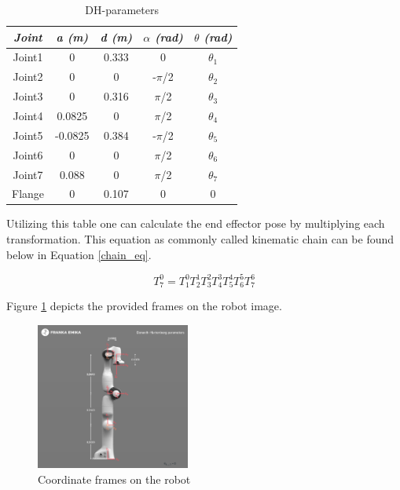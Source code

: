 \begin{table}[ht]
    \caption{DH-parameters}
    \label{dhtable}
    \begin{center}
        \begin{tabular}{|c|c|c|c|c|}
            \hline
            \textbf{\textit{Joint}} & \textbf{\textit{a (m)}} & \textbf{\textit{d (m)}} & \textbf{\textit{ $\alpha$
                (rad)}}& \textbf{\textit{ $\theta$ (rad)}}\\
            \hline
            Joint1 & 0 & 0.333 & 0
            & $\theta_{1}$ \\
            \hline
            Joint2 & 0 & 0 & -$\pi$/2
            & $\theta_{2}$ \\
            \hline
            Joint3 & 0 & 0.316 & $\pi$/2
            & $\theta_{3}$ \\
            \hline
            Joint4 & 0.0825 & 0 & $\pi$/2
            & $\theta_{4}$ \\
            \hline
            Joint5 & -0.0825 & 0.384 & -$\pi$/2
            & $\theta_{5}$ \\
            \hline
            Joint6 & 0 & 0 & $\pi$/2
            & $\theta_{6}$ \\
            \hline
            Joint7 & 0.088 & 0 & $\pi$/2
            & $\theta_{7}$ \\
            \hline
            Flange & 0 & 0.107 & 0 & 0 \\
            \hline
        \end{tabular}
        \label{tab2}
    \end{center}
\end{table}

Utilizing this table one can calculate the end effector pose by multiplying each transformation. This equation as commonly called kinematic chain can be found below in Equation \ref{chain_eq}.

\begin{equation}
    \label{chain_eq}
    T_7^0 = T_1^0 T_2^1 T_3^2 T_4^3 T_5^4 T_6^5 T_7^6
\end{equation}

Figure \ref{robot_img} depicts the provided frames on the robot image.


\begin{figure}[ht]
    \centering
    \includegraphics[width=0.45\textwidth]{images/dh-diagram.png}
    \caption{Coordinate frames on the robot}
    \label{robot_img}
\end{figure}
